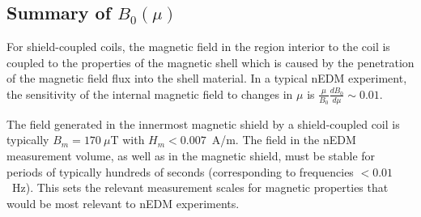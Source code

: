 \subsection{Summary of $B_0(\mu)$ \label{sec:theory_summary}}

For shield-coupled coils, the magnetic field in the region interior to
the coil is coupled to the properties of the magnetic shell which is
caused by the penetration of the magnetic field flux into the shell
material. In a typical nEDM experiment, the sensitivity of the
internal magnetic field to changes in $\mu$ is
$\frac{\mu}{B_0}\frac{dB_0}{d\mu}\sim 0.01$.


The field generated in the innermost magnetic shield by a
shield-coupled coil is typically $B_m=170~\mu$T with $H_m<0.007$~A/m.
The field in the nEDM measurement volume, as well as in the magnetic
shield, must be stable for periods of typically hundreds of seconds
(corresponding to frequencies $<0.01$~Hz).  This sets the relevant
measurement scales for magnetic properties that would be most relevant
to nEDM experiments.
